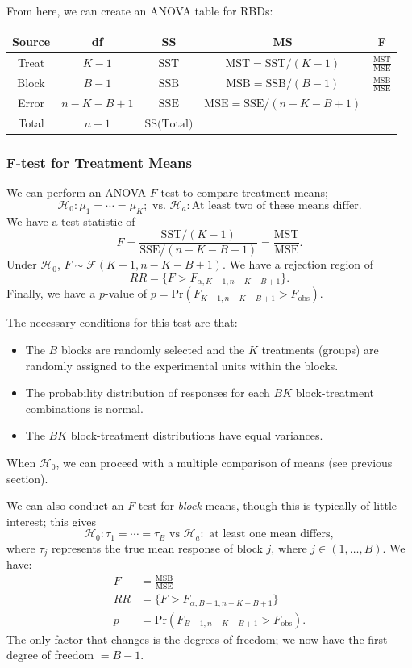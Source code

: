 \documentclass[12pt]{article}
\begin{document}
From here, we can create an ANOVA table for RBDs:

\begin{center}
    \begin{tabular}{c c c c c}
        Source & df & SS & MS & F\\
        \hline
        Treat & $K-1$ & $\text{SST}$ & $\text{MST}=\text{SST}/(K-1)$ & $\frac{\text{MST}}{\text{MSE}}$\\
        Block & $B-1$ & $\text{SSB}$ & $\text{MSB}=\text{SSB}/(B-1)$ & $\frac{\text{MSB}}{\text{MSE}}$\\
        Error & $n-K-B+1$ & $\text{SSE}$ & $\text{MSE}=\text{SSE}/(n-K-B+1)$ & \\
        \hline
        Total & $n-1$ & $\text{SS(Total)}$ & & \\
    \end{tabular}
\end{center}

\subsubsection{F-test for Treatment Means}

We can perform an ANOVA $F$-test to compare treatment means; \[\mathcal{H}_0: \mu_1 = \cdots = \mu_K; \text{ vs. } \mathcal{H}_a: \text{At least two of these means differ}.\] We have a test-statistic of \[F = \frac{\text{SST}/(K-1)}{\text{SSE}/(n-K-B+1)} = \frac{\text{MST}}{\text{MSE}}.\] Under $\mathcal{H}_0$, $F \sim \mathcal{F}(K - 1, n-K-B+1)$. We have a rejection region of \[RR = \{F > F_{\alpha, K-1, n-K-B+1}\}.\] Finally, we have a $p$-value of $p = \text{Pr}(F_{K-1, n-K-B+1} > F_{\text{obs}}).$

The necessary conditions for this test are that: \begin{itemize}
    \item The $B$ blocks are randomly selected and the $K$ treatments (groups) are randomly assigned to the experimental units within the blocks.
    \item The probability distribution of responses for each $BK$ block-treatment combinations is normal.
    \item The $BK$ block-treatment distributions have equal variances.
\end{itemize}

When $\mathcal{H}_0$, we can proceed with a multiple comparison of means (see previous section).

We can also conduct an $F$-test for \textit{block} means, though this is typically of little interest; this gives \[\mathcal{H}_0: \tau_1 = \cdots = \tau_B \text{ vs } \mathcal{H}_a: \text{ at least one mean differs},\] where $\tau_j$ represents the true mean response of block $j$, where $j \in (1, \dots, B)$. We have: \begin{align*}
    F &= \frac{\text{MSB}}{\text{MSE}}\\
    RR &= \{F > F_{\alpha, B- 1, n-K-B+1}\}\\
    p &= \text{Pr}(F_{B-1, n-K-B+1} > F_{\text{obs}}).
\end{align*}
The only factor that changes is the degrees of freedom; we now have the first degree of freedom $= B-1$.
\end{document}
